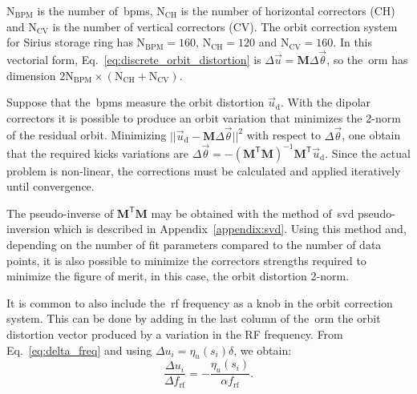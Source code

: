 $\mathrm{N}_{\mathrm{BPM}}$ is the number of~\gls{bpm}s, $\mathrm{N}_{\mathrm{CH}}$ is the number of horizontal correctors (CH) and $\mathrm{N}_{\mathrm{CV}}$ is the number of vertical correctors (CV). The orbit correction system for Sirius storage ring has $\mathrm{N}_{\mathrm{BPM}} = 160$, $\mathrm{N}_{\mathrm{CH}} = 120$ and $\mathrm{N}_{\mathrm{CV}} = 160$.  In this vectorial form, Eq.~\eqref{eq:discrete_orbit_distortion} is $\Delta \vec{u} = \mathbf{M} \Delta \vec{\theta}$, so the~\gls{orm} has dimension $2 \mathrm{N}_{\mathrm{BPM}} \times \left(\mathrm{N}_{\mathrm{CH}} + \mathrm{N}_{\mathrm{CV}}\right)$. 

Suppose that the~\gls{bpm}s measure the orbit distortion $\vec{u}_{\mathrm{d}}$. With the dipolar correctors it is possible to produce an orbit variation that minimizes the 2-norm of the residual orbit. Minimizing $||\vec{u}_{\mathrm{d}} - \mathbf{M}\Delta \vec{\theta}||^2$ with respect to $\Delta\vec{\theta}$, one obtain that the required kicks variations are $\Delta \vec{\theta} = -\left(\mathbf{M}^{\mathsf{T}}\mathbf{M}\right)^{-1}\mathbf{M}^{\mathsf{T}}\vec{u}_{\mathrm{d}}$. Since the actual problem is non-linear, the corrections must be calculated and applied iteratively until convergence. 

The pseudo-inverse of $\mathbf{M}^{\mathsf{T}}\mathbf{M}$ may be obtained with the method of~\gls{svd} pseudo-inversion which is described in Appendix~\ref{appendix:svd}. Using this method and, depending on the number of fit parameters compared to the number of data points, it is also possible to minimize the correctors strengths required to minimize the figure of merit, in this case, the orbit distortion 2-norm.

It is common to also include the~\gls{rf} frequency as a knob in the orbit correction system. This can be done by adding in the last column of the~\gls{orm} the orbit distortion vector produced by a variation in the RF frequency. From Eq.~\eqref{eq:delta_freq} and using $\Delta u_i = \eta_u(s_i) \delta$, we obtain:
\begin{equation}
    \dfrac{\Delta u_i}{ \Delta f_{\mathrm{rf}}} = - \dfrac{\eta_u(s_i)}{\alpha f_{\mathrm{rf}}}.
    \label{eq:rf_column}
\end{equation}

